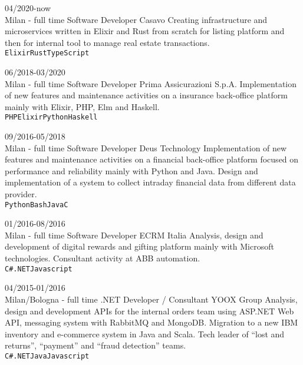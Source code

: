 \documentclass[9pt]{developercv}
\begin{document}
\begin{entrylist}
	\entry
		{04/2020-now\\\footnotesize{Milan - full time}}
		{Software Developer}
		{Casavo}
		{Creating infrastructure and microservices written in Elixir and Rust from scratch for listing platform and then for internal tool to manage real estate transactions. \\
	   \texttt{Elixir}\slashsep\texttt{Rust}\slashsep\texttt{TypeScript}}

	\entry
		{06/2018-03/2020\\\footnotesize{Milan - full time}}
		{Software Developer}
		{Prima Assicurazioni S.p.A.}
		{Implementation of new features and maintenance activities on a insurance back-office platform mainly with Elixir, PHP, Elm and Haskell. \\ \texttt{PHP}\slashsep\texttt{Elixir}\slashsep\texttt{Python}\slashsep\texttt{Haskell}}

	\entry
		{09/2016-05/2018\\\footnotesize{Milan - full time}}
		{Software Developer}
		{Deus Technology}
		{Implementation of new features and maintenance activities on a financial back-office platform focused on performance and reliability mainly with Python and Java. Design and implementation of a system to collect intraday financial data from different data provider. \\ \texttt{Python}\slashsep\texttt{Bash}\slashsep\texttt{Java}\slashsep\texttt{C}}

	\entry
		{01/2016-08/2016\\\footnotesize{Milan - full time}}
		{Software Developer}
		{ECRM Italia}
		{Analysis, design and development of digital rewards and gifting platform mainly with Microsoft technologies. Consultant activity at ABB automation. \\
	   \texttt{C\#}\slashsep\texttt{.NET}\slashsep\texttt{Javascript}}

	\entry
		{04/2015-01/2016\\\footnotesize{Milan/Bologna - full time}}
		{.NET Developer / Consultant}
		{YOOX Group}
		{Analysis, design and development APIs for the internal orders team using ASP.NET Web API, messaging system with RabbitMQ and MongoDB. Migration to a new IBM inventory and e-commerce system in Java and Scala. Tech leader of “lost and returns”, “payment” and “fraud detection” teams. \\
	   \texttt{C\#}\slashsep\texttt{.NET}\slashsep\texttt{Java}\slashsep\texttt{Javascript}}


\end{entrylist}
\end{document}
